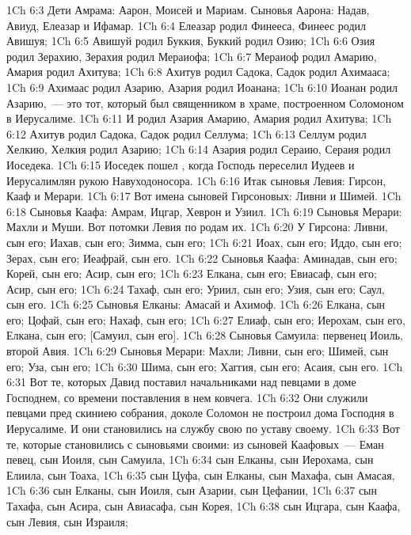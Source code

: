 \vs 1Ch 6:3 Дети Амрама: Аарон, Моисей и Мариам. Сыновья Аарона: Надав, Авиуд, Елеазар и Ифамар.
\vs 1Ch 6:4 Елеазар родил Финееса, Финеес родил Авишуя;
\vs 1Ch 6:5 Авишуй родил Буккия, Буккий родил Озию;
\vs 1Ch 6:6 Озия родил Зерахию, Зерахия родил Мераиофа;
\vs 1Ch 6:7 Мераиоф родил Амарию, Амария родил Ахитува;
\vs 1Ch 6:8 Ахитув родил Садока, Садок родил Ахимааса;
\vs 1Ch 6:9 Ахимаас родил Азарию, Азария родил Иоанана;
\vs 1Ch 6:10 Иоанан родил Азарию,~--- это тот, который был священником в храме, построенном Соломоном в Иерусалиме.
\vs 1Ch 6:11 И родил Азария Амарию, Амария родил Ахитува;
\vs 1Ch 6:12 Ахитув родил Садока, Садок родил Селлума;
\vs 1Ch 6:13 Селлум родил Хелкию, Хелкия родил Азарию;
\vs 1Ch 6:14 Азария родил Сераию, Сераия родил Иоседека.
\vs 1Ch 6:15 Иоседек пошел , когда Господь переселил Иудеев и Иерусалимлян рукою Навуходоносора.
\rsbpar\vs 1Ch 6:16 Итак сыновья Левия: Гирсон, Кааф и Мерари.
\vs 1Ch 6:17 Вот имена сыновей Гирсоновых: Ливни и Шимей.
\vs 1Ch 6:18 Сыновья Каафа: Амрам, Ицгар, Хеврон и Узиил.
\vs 1Ch 6:19 Сыновья Мерари: Махли и Муши. Вот потомки Левия по родам их.
\vs 1Ch 6:20 У Гирсона: Ливни, сын его; Иахав, сын его; Зимма, сын его;
\vs 1Ch 6:21 Иоах, сын его; Иддо, сын его; Зерах, сын его; Иеафрай, сын его.
\vs 1Ch 6:22 Сыновья Каафа: Аминадав, сын его; Корей, сын его; Асир, сын его;
\vs 1Ch 6:23 Елкана, сын его; Евиасаф, сын его; Асир, сын его;
\vs 1Ch 6:24 Тахаф, сын его; Уриил, сын его; Узия, сын его; Саул, сын его.
\vs 1Ch 6:25 Сыновья Елканы: Амасай и Ахимоф.
\vs 1Ch 6:26 Елкана, сын его; Цофай, сын его; Нахаф, сын его;
\vs 1Ch 6:27 Елиаф, сын его; Иерохам, сын его, Елкана, сын его; [Самуил, сын его].
\vs 1Ch 6:28 Сыновья Самуила: первенец Иоиль, второй Авия.
\vs 1Ch 6:29 Сыновья Мерари: Махли; Ливни, сын его; Шимей, сын его; Уза, сын его;
\vs 1Ch 6:30 Шима, сын его; Хаггия, сын его; Асаия, сын его.
\vs 1Ch 6:31 Вот те, которых Давид поставил начальниками над певцами в доме Господнем, со времени поставления в нем ковчега.
\vs 1Ch 6:32 Они служили певцами пред скиниею собрания, доколе Соломон не построил дома Господня в Иерусалиме. И они становились на службу свою по уставу своему.
\rsbpar\vs 1Ch 6:33 Вот те, которые становились с сыновьями своими: из сыновей Каафовых~--- Еман певец, сын Иоиля, сын Самуила,
\vs 1Ch 6:34 сын Елканы, сын Иерохама, сын Елиила, сын Тоаха,
\vs 1Ch 6:35 сын Цуфа, сын Елканы, сын Махафа, сын Амасая,
\vs 1Ch 6:36 сын Елканы, сын Иоиля, сын Азарии, сын Цефании,
\vs 1Ch 6:37 сын Тахафа, сын Асира, сын Авиасафа, сын Корея,
\vs 1Ch 6:38 сын Ицгара, сын Каафа, сын Левия, сын Израиля;
